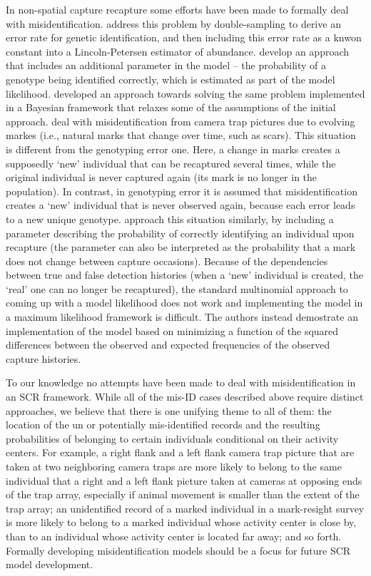 In non-spatial capture recapture some efforts have been made to
formally deal with misidentification. \citet{stevick_etal:2001}
address this problem by double-sampling to derive an error rate for
genetic identification, and then including this error rate as a knwon
constant into a Lincoln-Petersen estimator of
abundance. \citet{lukacs_burnham:2005} develop an approach that
includes an additional parameter in the model -- the probability of a
genotype being identified correctly, which is estimated as part of the
model likelihood. \citet{link_etal:2010} developed an approach towards
solving the same problem implemented in a Bayesian framework that
relaxes some of the assumptions of the initial approach.
\citet{yoshizaki_etal:2009} deal with misidentification from camera
trap pictures due to evolving markes (i.e., natural marks that change
over time, such as scars). This situation is different from the
genotyping error one. Here, a change in marks creates a supposedly
`new' individual that can be recaptured several times, while the
original individual is never captured again (its mark is no longer in
the population). In contrast, in genotyping error it is assumed that
misidentification creates a `new' individual that is never observed
again, because each error leads to a new unique
genotype. \citet{yoshizaki_etal:2009} approach this situation
similarly, by including a parameter describing the probability of
correctly identifying an individual upon recapture (the parameter can
also be interpreted as the probability that a mark does not change
between capture occasions). Because of the dependencies between true
and false detection histories (when a `new' individual is created, the
`real' one can no longer be recaptured), the standard multinomial
approach to coming up with a model likelihood does not work and
implementing the model in a maximum likelihood framework is
difficult. The authors instead demostrate an implementation of the
model based on minimizing a function of the squared differences
between the observed and expected frequencies of the observed capture
histories.

To our knowledge no attempts have been made to deal with
misidentification in an SCR framework. While all of the mis-ID cases
described above require distinct approaches, we believe that there is
one unifying theme to all of them: the location of the un or
potentially mis-identified records and the resulting probabilities of
belonging to certain individuals conditional on their activity
centers. For example, a right flank and a left flank camera trap
picture that are taken at two neighboring camera traps are more likely
to belong to the same individual that a right and a left flank picture
taken at cameras at opposing ends of the trap array, especially if
animal movement is smaller than the extent of the trap array; an
unidentified record of a marked individual in a mark-resight survey is
more likely to belong to a marked individual whose activity center is
close by, than to an individual whose activity center is located far
away; and so forth. Formally developing misidentification models
should be a focus for future SCR model development.

